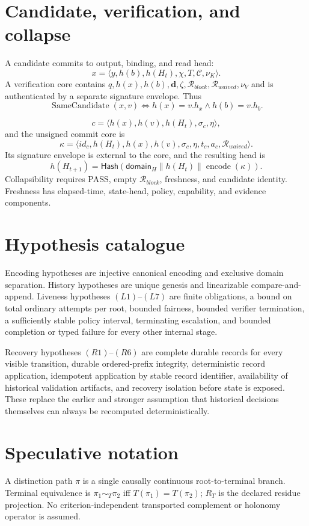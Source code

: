 \documentclass[11pt,openany]{book}
\newcommand{\Hash}{\mathsf{Hash}}
\begin{document}
\section{Candidate, verification, and collapse}
A candidate commits to output, binding, and read head:
\[
 x=\langle y,h(b),h(H_t),\chi,T,\mathcal C,\nu_K\rangle .
\]
A verification core contains \(q, h(x), h(b),\mathbf d,\zeta,
\mathcal R_{block},\mathcal R_{waived},\nu_V\) and is authenticated by a
separate signature envelope. Thus
\[
 \operatorname{SameCandidate}(x,v)
 \iff h(x)=v.h_x\land h(b)=v.h_b.
\]

\[
 c=\langle h(x),h(v),h(H_t),\sigma_c,\eta\rangle ,
\]
and the unsigned commit core is
\[
 \kappa=\langle id_c,h(H_t),h(x),h(v),\sigma_c,\eta,t_c,a_c,
                 \mathcal R_{waived}\rangle .
\]
Its signature envelope is external to the core, and the resulting head is
\[
 h(H_{t+1})=\Hash(\mathsf{domain}_H\parallel h(H_t)\parallel
                         \operatorname{encode}(\kappa)).
\]
Collapsibility requires PASS, empty \(\mathcal R_{block}\), freshness, and
candidate identity. Freshness has elapsed-time, state-head, policy, capability,
and evidence components.

\section{Hypothesis catalogue}
Encoding hypotheses are injective canonical encoding and exclusive domain
separation. History hypotheses are unique genesis and linearizable
compare-and-append. Liveness hypotheses \((L1)\)--\((L7)\) are finite
obligations, a bound on total ordinary attempts per root, bounded fairness,
bounded verifier termination, a sufficiently stable policy interval,
terminating escalation, and bounded completion or typed failure for every
other internal stage.

Recovery hypotheses \((R1)\)--\((R6)\) are complete durable records for every
visible transition, durable ordered-prefix integrity, deterministic record
application, idempotent application by stable record identifier, availability
of historical validation artifacts, and recovery isolation before state is
exposed. These replace the earlier and stronger assumption that historical
decisions themselves can always be recomputed deterministically.

\section{Speculative notation}
A distinction path \(\pi\) is a single causally continuous root-to-terminal
branch. Terminal equivalence is \(\pi_1\sim_T\pi_2\) iff
\(T(\pi_1)=T(\pi_2)\); \(R_T\) is the declared residue projection. No
criterion-independent transported complement or holonomy operator is assumed.
\end{document}
